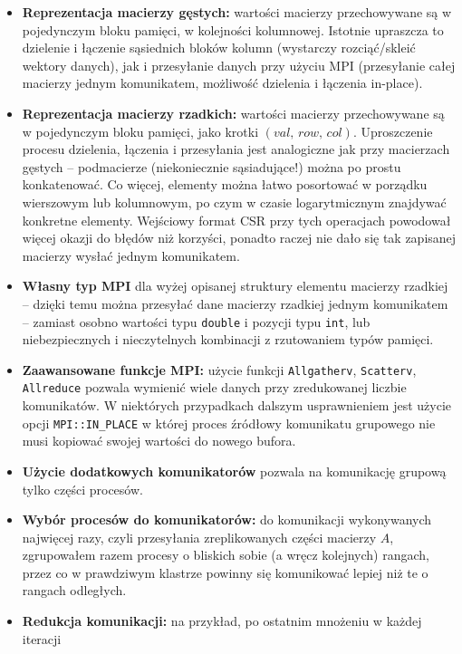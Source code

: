 \documentclass[a4paper,12pt,oneside]{article}
\begin{document}
\begin{itemize}
    \item {\bf Reprezentacja macierzy gęstych:} wartości macierzy przechowywane są w pojedynczym
        bloku pamięci, w kolejności kolumnowej. Istotnie upraszcza to dzielenie i łączenie sąsiednich bloków kolumn
        (wystarczy rozciąć/skleić wektory danych), jak i przesyłanie danych przy użyciu MPI (przesyłanie całej macierzy
        jednym komunikatem, możliwość dzielenia i łączenia in-place).
    \item {\bf Reprezentacja macierzy rzadkich:} wartości macierzy przechowywane są w pojedynczym
        bloku pamięci, jako krotki $(val,\,row,\,col)$. Uproszczenie procesu dzielenia, łączenia
        i przesyłania jest analogiczne jak przy macierzach gęstych -- podmacierze (niekoniecznie sąsiadujące!)
        można po prostu konkatenować. Co więcej, elementy można łatwo posortować w porządku wierszowym
        lub kolumnowym, po czym w czasie logarytmicznym znajdywać konkretne elementy.
        Wejściowy format CSR przy tych operacjach powodował więcej okazji do błędów niż korzyści,
        ponadto raczej nie dało się tak zapisanej macierzy wysłać jednym komunikatem.
    \item {\bf Własny typ MPI} dla wyżej opisanej struktury elementu macierzy rzadkiej -- dzięki temu
        można przesyłać dane macierzy rzadkiej jednym komunikatem -- zamiast osobno wartości typu
        {\tt double} i pozycji typu {\tt int}, lub niebezpiecznych i nieczytelnych kombinacji
        z rzutowaniem typów pamięci.
    \item {\bf Zaawansowane funkcje MPI:} użycie funkcji {\tt Allgatherv}, {\tt Scatterv},
        {\tt Allreduce} pozwala wymienić wiele danych przy zredukowanej liczbie komunikatów. W niektórych
        przypadkach dalszym usprawnieniem jest użycie opcji {\tt MPI::IN\_PLACE} w której proces
        źródłowy komunikatu grupowego nie musi kopiować swojej wartości do nowego bufora.
    \item {\bf Użycie dodatkowych komunikatorów} pozwala na komunikację grupową tylko części procesów.
    \item {\bf Wybór procesów do komunikatorów:} do komunikacji wykonywanych najwięcej razy,
        czyli przesyłania zreplikowanych części macierzy $A$, zgrupowałem razem procesy o bliskich 
        sobie (a wręcz kolejnych) rangach, przez co w prawdziwym klastrze powinny się komunikować lepiej niż
        te o rangach odległych.
    \item {\bf Redukcja komunikacji:} na przykład, po ostatnim mnożeniu w każdej iteracji

\end{itemize}
\end{document}
